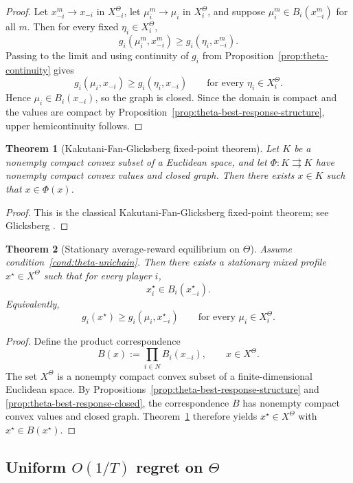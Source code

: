 \documentclass[11pt]{article}
\newtheorem{theorem}{Theorem}[section]
\theoremstyle{definition}
\newcommand{\1}{\mathbf{1}}
\begin{document}
\begin{proof}
Let $x_{-i}^m\to x_{-i}$ in $X_{-i}^\Theta$, let $\mu_i^m\to\mu_i$ in $X_i^\Theta$, and suppose $\mu_i^m\in B_i(x_{-i}^m)$ for all $m$. Then for every fixed $\eta_i\in X_i^\Theta$,
\[
g_i(\mu_i^m,x_{-i}^m)\ge g_i(\eta_i,x_{-i}^m).
\]
Passing to the limit and using continuity of $g_i$ from Proposition~\ref{prop:theta-continuity} gives
\[
g_i(\mu_i,x_{-i})\ge g_i(\eta_i,x_{-i})
\qquad\text{for every }\eta_i\in X_i^\Theta.
\]
Hence $\mu_i\in B_i(x_{-i})$, so the graph is closed. Since the domain is compact and the values are compact by Proposition~\ref{prop:theta-best-response-structure}, upper hemicontinuity follows.
\end{proof}

\begin{theorem}[Kakutani-Fan-Glicksberg fixed-point theorem]\label{thm:kfg}
Let $K$ be a nonempty compact convex subset of a Euclidean space, and let $\Phi:K\rightrightarrows K$ have nonempty compact convex values and closed graph. Then there exists $x\in K$ such that $x\in\Phi(x)$.
\end{theorem}

\begin{proof}
This is the classical Kakutani-Fan-Glicksberg fixed-point theorem; see Glicksberg \cite{Glicksberg1952}.
\end{proof}

\begin{theorem}[Stationary average-reward equilibrium on $\Theta$]\label{thm:theta-meta-equilibrium}
Assume condition~\ref{cond:theta-unichain}. Then there exists a stationary mixed profile $x^\star\in X^\Theta$ such that for every player $i$,
\[
x_i^\star\in B_i(x_{-i}^\star).
\]
Equivalently,
\[
g_i(x^\star)\ge g_i(\mu_i,x_{-i}^\star)
\qquad\text{for every }\mu_i\in X_i^\Theta.
\]
\end{theorem}

\begin{proof}
Define the product correspondence
\[
B(x):=\prod_{i\in N}B_i(x_{-i}),
\qquad x\in X^\Theta.
\]
The set $X^\Theta$ is a nonempty compact convex subset of a finite-dimensional Euclidean space. By Propositions~\ref{prop:theta-best-response-structure} and \ref{prop:theta-best-response-closed}, the correspondence $B$ has nonempty compact convex values and closed graph. Theorem~\ref{thm:kfg} therefore yields $x^\star\in X^\Theta$ with $x^\star\in B(x^\star)$.
\end{proof}

\subsection{Uniform $O(1/T)$ regret on $\Theta$}
\end{document}
